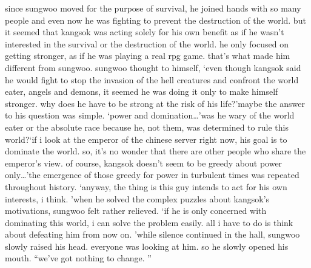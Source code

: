 since sungwoo moved for the purpose of survival, he joined hands with so many people and even now he was fighting to prevent the destruction of the world.
but it seemed that kangsok was acting solely for his own benefit as if he wasn’t interested in the survival or the destruction of the world.
 he only focused on getting stronger, as if he was playing a real rpg game.
that’s what made him different from sungwoo.
sungwoo thought to himself, ‘even though kangsok said he would fight to stop the invasion of the hell creatures and confront the world eater, angels and demons, it seemed he was doing it only to make himself stronger.
 why does he have to be strong at the risk of his life?’maybe the answer to his question was simple.
‘power and domination…’was he wary of the world eater or the absolute race because he, not them, was determined to rule this world?‘if i look at the emperor of the chinese server right now, his goal is to dominate the world.
 so, it’s no wonder that there are other people who share the emperor’s view.
 of course, kangsok doesn’t seem to be greedy about power only…’the emergence of those greedy for power in turbulent times was repeated throughout history.
‘anyway, the thing is this guy intends to act for his own interests, i think.
’when he solved the complex puzzles about kangsok’s motivations, sungwoo felt rather relieved.
‘if he is only concerned with dominating this world, i can solve the problem easily.
 all i have to do is think about defeating him from now on.
’while silence continued in the hall, sungwoo slowly raised his head.
 everyone was looking at him.
so he slowly opened his mouth.
“we’ve got nothing to change.
”

 